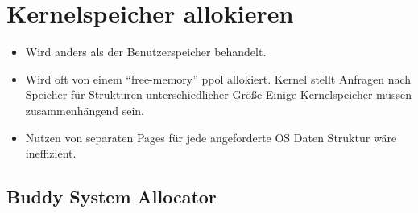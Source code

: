 \documentclass[a4paper]{scrreprt}
\begin{document}
\section{Kernelspeicher allokieren}

\begin{itemize}
\item Wird anders als der Benutzerspeicher behandelt.
\item Wird oft von einem "`free-memory"' ppol allokiert.
\subitem Kernel stellt Anfragen nach Speicher für Strukturen unterschiedlicher Größe
\subitem Einige Kernelspeicher müssen zusammenhängend sein.
\item Nutzen von separaten Pages für jede angeforderte OS Daten Struktur wäre ineffizient.
\end{itemize}
\subsection{Buddy System Allocator}
\end{document}
